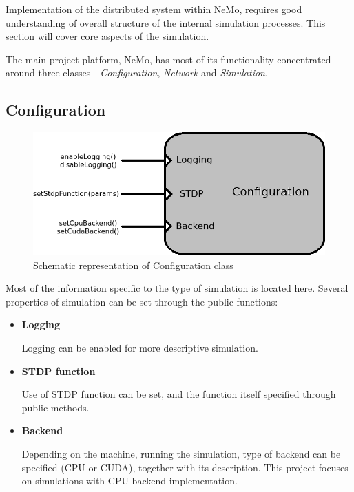 Implementation of the distributed system within NeMo, requires good understanding of overall structure of the internal simulation processes. This section will cover core aspects of the simulation.

The main project platform, NeMo, has most of its functionality concentrated around three classes - \emph{Configuration}, \emph{Network} and \emph{Simulation}.

\subsection{Configuration}

\begin{figure}[h!]
\begin{center}
\includegraphics[scale = 0.7]{images/background/configuration_scheme.png}
\end{center}
\caption{Schematic representation of Configuration class}
\end{figure}

Most of the information specific to the type of simulation is located here. Several properties of simulation can be set through the public functions:

\begin{itemize}
\item{\textbf{Logging}}

Logging can be enabled for more descriptive simulation.

\item{\textbf{STDP function}}

Use of STDP function can be set, and the function itself specified through public methods.

\item{\textbf{Backend}}

Depending on the machine, running the simulation, type of backend can be specified (CPU or CUDA), together with its description. This project focuses on simulations with CPU backend implementation.
\end{itemize}

